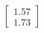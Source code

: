 \documentclass[preview]{standalone}
\begin{document}
\begin{align*}
\begin{bmatrix} 1.57 \\ 1.73 \end{bmatrix}
\end{align*}
\end{document}
